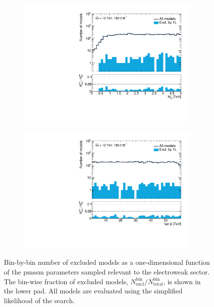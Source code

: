 \begin{figure}
\begin{subfigure}[b]{0.5\linewidth}
	\end{subfigure}\hfill
	\begin{subfigure}[b]{0.5\linewidth}
		\centering\includegraphics[width=\textwidth]{1D/mA}
	\end{subfigure}\hfill
	\begin{subfigure}[b]{0.5\linewidth}
		\centering\includegraphics[width=\textwidth]{1D/tanb}
	\end{subfigure}\hfill
	\caption{Bin-by-bin number of excluded models as a one-dimensional function of the \gls{pmssm} parameters sampled relevant to the electroweak sector. The bin-wise fraction of excluded models, $N^\mathrm{bin}_\mathrm{excl} / N^\mathrm{bin}_\mathrm{total}$, is shown in the lower pad. All models are evaluated using the simplified likelihood of the \onelepton search.}
	\label{fig:impact_pMSSM_parameters_1D}
\end{figure}

